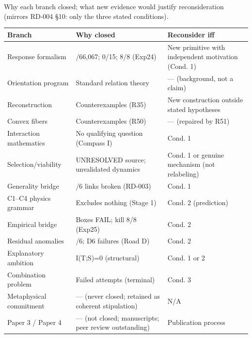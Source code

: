 \documentclass[
  11pt,
]{book}
\begin{document}
Why each branch closed; what new evidence would justify reconsideration
(mirrors RD-004 §10: only the three stated conditions).

\begin{longtable}[]{@{}
  >{\raggedright\arraybackslash}p{}
  >{\raggedright\arraybackslash}p{}
  >{\raggedright\arraybackslash}p{}@{}}
\toprule\noalign{}
\begin{minipage}[b]{\linewidth}\raggedright
Branch
\end{minipage} & \begin{minipage}[b]{\linewidth}\raggedright
Why closed
\end{minipage} & \begin{minipage}[b]{\linewidth}\raggedright
Reconsider iff
\end{minipage} \\
\midrule\noalign{}
\endhead
\bottomrule\noalign{}
\endlastfoot
Response formalism & 0/66,067; 0/15; 8/8 (Exp24) & New primitive with
independent motivation (Cond. 1) \\
Orientation program & Standard relation theory & --- (background, not a
claim) \\
Reconstruction & Counterexamples (R35) & New construction outside stated
hypotheses \\
Convex fibers & Counterexamples (R50) & --- (repaired by R51) \\
Interaction mathematics & No qualifying question (Compass I) & Cond.
1 \\
Selection/viability & UNRESOLVED source; unvalidated dynamics & Cond. 1
or genuine mechanism (not relabeling) \\
Generality bridge & 4/6 links broken (RD-003) & Cond. 1 \\
C1--C4 physics grammar & Excludes nothing (Stage 1) & Cond. 2
(prediction) \\
Empirical bridge & Boxes FAIL; kill 8/8 (Exp25) & Cond. 2 \\
Residual anomalies & 0/6; D6 failures (Road D) & Cond. 2 \\
Explanatory ambition & I(T;S)=0 (structural) & Cond. 1 or 2 \\
Combination problem & Failed attempts (terminal) & Cond. 3 \\
Metaphysical commitment & --- (never closed; retained as coherent
stipulation) & N/A \\
Paper 3 / Paper 4 & --- (not closed; manuscripts; peer review
outstanding) & Publication process \\
\end{longtable}
\end{document}
